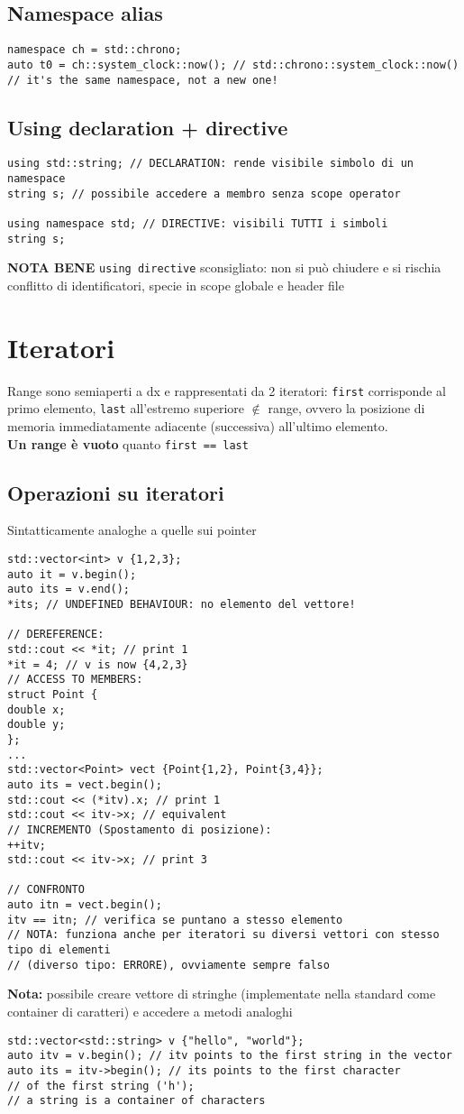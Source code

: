 \documentclass[10pt, oneside]{Book}
\begin{document}
\subsection{Namespace alias}
\begin{verbatim}
namespace ch = std::chrono;
auto t0 = ch::system_clock::now(); // std::chrono::system_clock::now()
// it's the same namespace, not a new one!
\end{verbatim}
\subsection{Using declaration + directive}
\begin{verbatim}
using std::string; // DECLARATION: rende visibile simbolo di un namespace           
string s; // possibile accedere a membro senza scope operator

using namespace std; // DIRECTIVE: visibili TUTTI i simboli
string s;
\end{verbatim}
\textbf{NOTA BENE} \texttt{using directive} sconsigliato: non si può chiudere e si rischia conflitto di identificatori, specie in scope globale e header file

\section{Iteratori}
Range sono semiaperti a dx e rappresentati da 2 iteratori:
\texttt{first} corrisponde al primo elemento, \texttt{last} all'estremo superiore $\notin$ range, ovvero la posizione di memoria immediatamente adiacente (successiva) all'ultimo elemento.
\\\textbf{Un range è vuoto} quanto \texttt{first == last}
\subsection{Operazioni su iteratori}
Sintatticamente analoghe a quelle sui pointer
\begin{verbatim}
std::vector<int> v {1,2,3};
auto it = v.begin();
auto its = v.end();
*its; // UNDEFINED BEHAVIOUR: no elemento del vettore!

// DEREFERENCE:
std::cout << *it; // print 1
*it = 4; // v is now {4,2,3}
// ACCESS TO MEMBERS:
struct Point {
double x;
double y;
};
...
std::vector<Point> vect {Point{1,2}, Point{3,4}};
auto its = vect.begin();
std::cout << (*itv).x; // print 1
std::cout << itv->x; // equivalent
// INCREMENTO (Spostamento di posizione):
++itv;
std::cout << itv->x; // print 3

// CONFRONTO
auto itn = vect.begin();
itv == itn; // verifica se puntano a stesso elemento
// NOTA: funziona anche per iteratori su diversi vettori con stesso tipo di elementi 
// (diverso tipo: ERRORE), ovviamente sempre falso
\end{verbatim}
\textbf{Nota:} possibile creare vettore di stringhe (implementate nella standard come container di caratteri) e accedere a metodi analoghi
\begin{verbatim}
std::vector<std::string> v {"hello", "world"};
auto itv = v.begin(); // itv points to the first string in the vector
auto its = itv->begin(); // its points to the first character
// of the first string ('h');
// a string is a container of characters
\end{verbatim}
\end{document}
